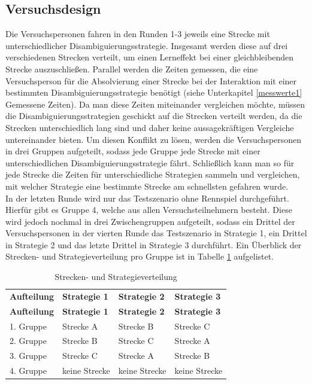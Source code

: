 \documentclass[12pt,a4paper]{scrartcl}
\begin{document}
\subsection{Versuchsdesign}
Die Versuchspersonen fahren in den Runden 1-3 jeweils eine Strecke mit unterschiedlicher Disambiguierungsstrategie. Insgesamt werden diese auf drei verschiedenen Strecken verteilt, um einen Lerneffekt bei einer gleichbleibenden Strecke auszuschließen. Parallel  werden die Zeiten gemessen, die eine Versuchsperson für die Absolvierung einer Strecke bei der Interaktion mit einer bestimmten Disambiguierungsstrategie benötigt (siehe Unterkapitel \ref{messwerte1} Gemessene Zeiten). Da man diese Zeiten miteinander vergleichen möchte, müssen die Disambiguierungsstrategien geschickt auf die Strecken verteilt werden, da die Strecken unterschiedlich lang sind und daher keine aussagekräftigen Vergleiche untereinander bieten. Um diesen Konflikt zu lösen, werden die Versuchspersonen in drei Gruppen aufgeteilt, sodass jede Gruppe jede Strecke mit einer unterschiedlichen Disambiguierungsstrategie fährt. Schließlich kann man so für jede Strecke die Zeiten für unterschiedliche Strategien sammeln und vergleichen, mit welcher Strategie eine bestimmte Strecke am schnellsten gefahren wurde. \\
In der letzten Runde wird nur das Testszenario ohne Rennspiel durchgeführt. Hierfür gibt es Gruppe 4, welche aus allen Versuchsteilnehmern besteht. Diese wird jedoch nochmal in drei Zwischengruppen aufgeteilt, sodass ein Drittel der Versuchspersonen in der vierten Runde das Testszenario in Strategie 1, ein Drittel in Strategie 2 und das letzte Drittel in Strategie 3 durchführt. Ein Überblick der Strecken- und Strategieverteilung pro Gruppe ist in Tabelle \ref{verteilung1} aufgelistet. 

\begin{longtable}{p{3cm}p{3cm}p{3cm}p{3cm} }
	\label{verteilung1}\\
	\caption[Strecken- und Strategieverteilung]{Strecken- und Strategieverteilung}\\
	\hline
	\textbf{Aufteilung}&\textbf{Strategie 1}&\textbf{Strategie 2} &\textbf{Strategie 3}\\
	\hline
	\endfirsthead
	\hline
	\textbf{Aufteilung}&\textbf{Strategie 1}&\textbf{Strategie 2} &\textbf{Strategie 3}\\
	\hline
	\endhead
1. Gruppe & Strecke A & Strecke B & Strecke C \\
2. Gruppe & Strecke B & Strecke C & Strecke A \\
3. Gruppe  & Strecke C & Strecke A & Strecke B \\
4. Gruppe   & keine Strecke & keine Strecke & keine Strecke\\ 
\hline
\end{longtable}
\end{document}
